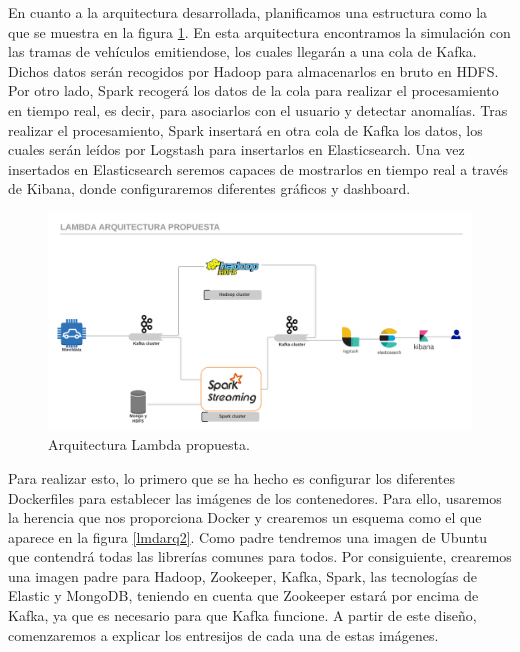 En cuanto a la arquitectura desarrollada, planificamos una estructura como
la que se muestra en la figura \ref{lmdarq1}. En esta arquitectura
encontramos la simulación con las tramas de vehículos emitiendose, los
cuales llegarán a una cola de Kafka. Dichos datos serán recogidos por
Hadoop para almacenarlos en bruto en HDFS. Por otro lado, Spark recogerá
los datos de la cola para realizar el procesamiento en tiempo real, es
decir, para asociarlos con el usuario y detectar anomalías. Tras realizar
el procesamiento, Spark insertará en otra cola de Kafka los datos, los
cuales serán leídos por Logstash para insertarlos en Elasticsearch. Una vez
insertados en Elasticsearch seremos capaces de mostrarlos en tiempo real a
través de Kibana, donde configuraremos diferentes gráficos y dashboard.

\begin{figure}[htp]
\centering
\includegraphics[scale=0.26]{Imagenes/arqProp1.png}
\caption{Arquitectura Lambda propuesta.}
\label{lmdarq1}
\end{figure}

Para realizar esto, lo primero que se ha hecho es configurar los diferentes
Dockerfiles para establecer las imágenes de los contenedores. Para ello,
usaremos la herencia que nos proporciona Docker y crearemos un esquema como
el que aparece en la figura \ref{lmdarq2}. Como padre tendremos una imagen
de Ubuntu que contendrá todas las librerías comunes para todos. Por
consiguiente, crearemos una imagen padre para Hadoop, Zookeeper, Kafka,
Spark, las tecnologías de Elastic y MongoDB, teniendo en cuenta que
Zookeeper estará por encima de Kafka, ya que es necesario para que Kafka
funcione. A partir de este diseño, comenzaremos a explicar los entresijos
de cada una de estas imágenes.


